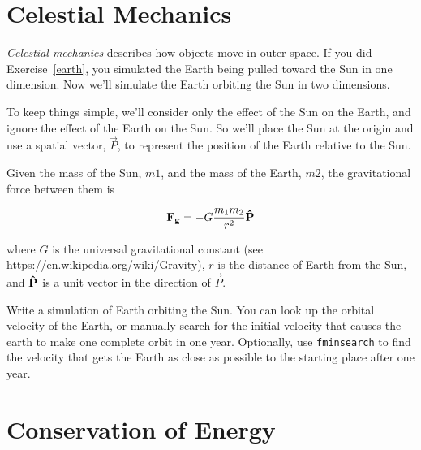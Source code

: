 \section{Celestial Mechanics}


\emph{Celestial mechanics} describes how objects move in outer space.
If you did Exercise~\ref{earth}, you simulated the Earth being pulled toward the Sun in one dimension.  Now we'll simulate the Earth orbiting the Sun in two dimensions.


To keep things simple, we'll consider only the effect of the Sun on the Earth, and ignore the effect of the Earth on the Sun.  So we'll place the Sun at the origin and use a spatial vector, $\vec{P}$, to represent the position of the Earth relative to the Sun.


Given the mass of the Sun, $m1$, and the mass of the Earth, $m2$, the gravitational force between them is

\begin{equation*}
\vec{F_g} = -G \frac{m_1 m_2}{r^2} \uvec{P}
\end{equation*}

where $G$ is the universal gravitational constant (see \url{https://en.wikipedia.org/wiki/Gravity}),
$r$ is the distance of Earth from the Sun, and
$\uvec{P}$ is a unit vector in the direction of $\vec{P}$.


\begin{ex}
Write a simulation of Earth orbiting the Sun.  You can look up the orbital velocity of the Earth, or manually search for the initial velocity that causes the earth to make one complete orbit in one year.  Optionally, use {\tt fminsearch} to find the velocity that gets the Earth as close as possible to the starting place after one year.


\end{ex}


\section{Conservation of Energy}

